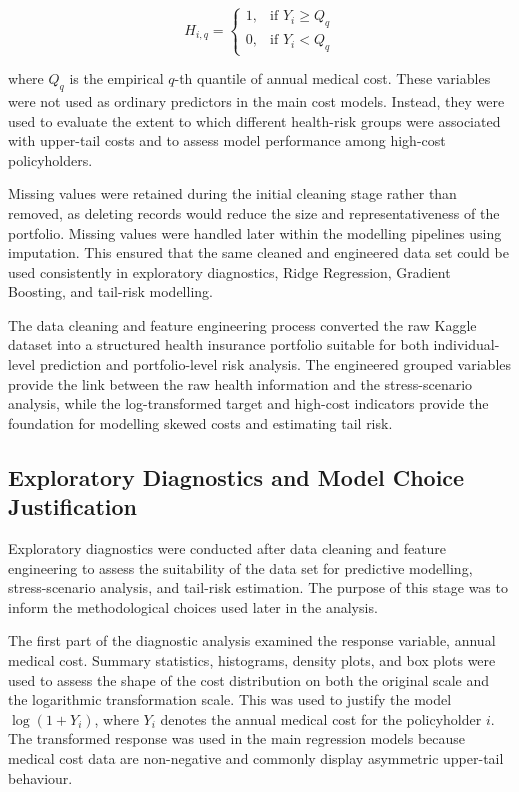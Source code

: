 	\begin{equation} \label{eq:4}
		H_{i,q} =
		\left\{
		\begin{array}{ll}
			1, & \mbox{if } Y_i \geq Q_q \\
			0, & \mbox{if } Y_i < Q_q
		\end{array}
		\right.
	\end{equation}
	
	where \(Q_q\) is the empirical \(q\)-th quantile of annual medical cost. These variables were not used as ordinary predictors in the main cost models. Instead, they were used to evaluate the extent to which different health-risk groups were associated with upper-tail costs and to assess model performance among high-cost policyholders.
	
	Missing values were retained during the initial cleaning stage rather than removed, as deleting records would reduce the size and representativeness of the portfolio. Missing values were handled later within the modelling pipelines using imputation. This ensured that the same cleaned and engineered data set could be used consistently in exploratory diagnostics, Ridge Regression, Gradient Boosting, and tail-risk modelling.
	
	The data cleaning and feature engineering process converted the raw Kaggle dataset into a structured health insurance portfolio suitable for both individual-level prediction and portfolio-level risk analysis. The engineered grouped variables provide the link between the raw health information and the stress-scenario analysis, while the log-transformed target and high-cost indicators provide the foundation for modelling skewed costs and estimating tail risk.
	
	\subsection{Exploratory Diagnostics and Model Choice Justification}
	
	Exploratory diagnostics were conducted after data cleaning and feature engineering to assess the suitability of the data set for predictive modelling, stress-scenario analysis, and tail-risk estimation. The purpose of this stage was to inform the methodological choices used later in the analysis.
	
	The first part of the diagnostic analysis examined the response variable, annual medical cost. Summary statistics, histograms, density plots, and box plots were used to assess the shape of the cost distribution on both the original scale and the logarithmic transformation scale. This was used to justify the model \(\log(1 + Y_i)\), where \(Y_i\) denotes the annual medical cost for the policyholder \(i\). The transformed response was used in the main regression models because medical cost data are non-negative and commonly display asymmetric upper-tail behaviour.
	
